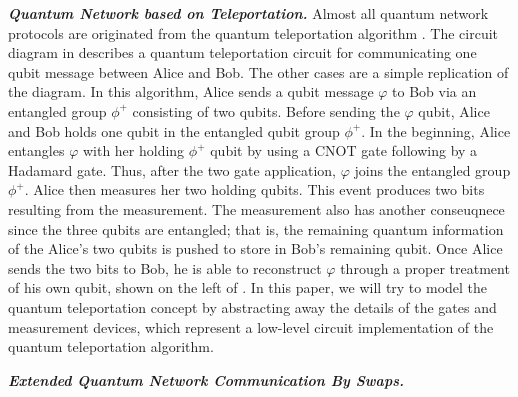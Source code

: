 \noindent\textbf{\textit{Quantum Network based on Teleportation.}}
Almost all quantum network protocols are originated from the quantum teleportation algorithm \cite{PhysRevLett.70.1895}.
The circuit diagram in  describes a quantum teleportation circuit for communicating one qubit message between Alice and Bob. The other cases are a simple replication of the diagram.
In this algorithm, Alice sends a qubit message $\varphi$ to Bob via an entangled group $\phi^{+}$ consisting of two qubits.
Before sending the $\varphi$ qubit, Alice and Bob holds one qubit in the entangled qubit group $\phi^{+}$.
In the beginning, Alice entangles $\varphi$ with her holding $\phi^{+}$ qubit by using a CNOT gate following by a Hadamard gate.
Thus, after the two gate application, $\varphi$ joins the entangled group $\phi^{+}$.
Alice then measures her two holding qubits. This event produces two bits resulting from the measurement.
The measurement also has another conseuqnece since the three qubits are entangled;
that is, the remaining quantum information of the Alice's two qubits is pushed to store in Bob's remaining qubit.
Once Alice sends the two bits to Bob, he is able to reconstruct $\varphi$ through a proper treatment of his own qubit,
shown on the left of .
In this paper, we will try to model the quantum teleportation concept
by abstracting away the details of the gates and measurement devices,
which represent a low-level circuit implementation of the quantum teleportation algorithm.

\noindent\textbf{\textit{Extended Quantum Network Communication By Swaps.}}

